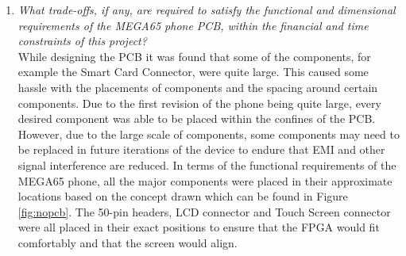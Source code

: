 \begin{enumerate}
\item \textit{What trade-offs, if any, are required to satisfy the functional and dimensional requirements of the MEGA65 phone PCB, within the financial and time constraints of this project?}\\

	While designing the PCB it was found that some of the components, for example the Smart Card Connector, were quite large. 
This caused some hassle with the placements of components and the spacing around certain components. 
Due to the first revision of the phone being quite large, every desired component was able to be placed within the confines of the PCB. 
However, due to the large scale of components, some components may need to be replaced in future iterations of the device to endure that EMI and other signal interference are reduced.
In terms of the functional requirements of the MEGA65 phone, all the major components were placed in their approximate locations based on the concept drawn which can be found in Figure \ref{fig:nopcb}. The 50-pin headers, LCD connector and Touch Screen connector were all placed in their exact positions to ensure that the FPGA would fit comfortably and that the screen would align.\\

\end{enumerate}






